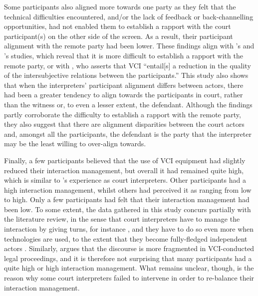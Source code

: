 \documentclass[output=paper]{langsci/langscibook}
\begin{document}
Some participants also aligned more towards one party as they felt that the technical difficulties encountered, and/or the lack of feedback or back-channelling opportunities, had not enabled them to establish a rapport with the court participant(s) on the other side of the screen. As a result, their participant alignment with the remote party had been lower. These findings align with \citet{Rombouts2011}’s and \citet{Napier2011}’s studies, which reveal that it is more difficult to establish a rapport with the remote party, or with \citep[4]{Braun2016b}, who asserts that \textsc{VCI} “entail[s] a reduction in the quality of the intersubjective relations between the participants.” This study also shows that when the interpreters’ participant alignment differs between actors, there had been a greater tendency to align towards the participants in court, rather than the witness or, to even a lesser extent, the defendant. Although the findings partly corroborate the difficulty to establish a rapport with the remote party, they also suggest that there are alignment disparities between the court actors and, amongst all the participants, the defendant is the party that the interpreter may be the least willing to over-align towards.

Finally, a few participants believed that the use of \textsc{VCI} equipment had slightly reduced their interaction management, but overall it had remained quite high, which is similar to \citet{Llewellyn-Jones2014}’s experience as court interpreters. Other participants had a high interaction management, whilst others had perceived it as ranging from low to high. Only a few participants had felt that their interaction management had been low. To some extent, the data gathered in this study concurs partially with the literature review, in the sense that court interpreters have to manage the interaction by giving turns, for instance \citep{Angelelli2003,Llewellyn-Jones2014,Martin2008}, and they have to do so even more when technologies are used, to the extent that they become fully-fledged independent actors \citep{Lee2007,Rosenberg2007}. Similarly, \citet{Braun2016a} argues that the discourse is more fragmented in \textsc{VCI}-conducted legal proceedings, and it is therefore not surprising that many participants had a quite high or high interaction management. What remains unclear, though, is the reason why some court interpreters failed to intervene in order to re-balance their interaction management. 
\end{document}
